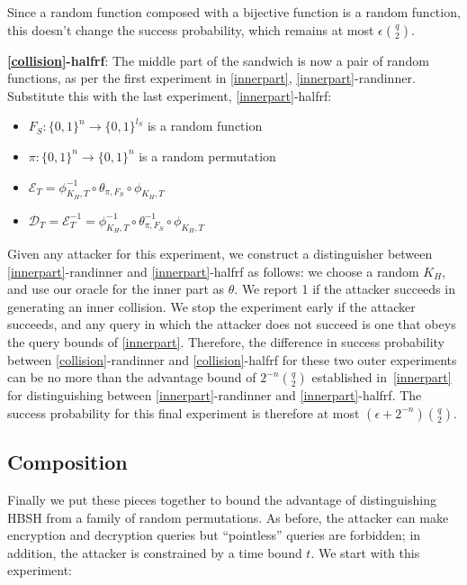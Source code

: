 \documentclass[journal=tosc,preprint,floatrow,submission]{iacrtrans}
\newcommand*{\xprm}[2]{\textsf{\ref*{#1}-#2}}
\newcommand*{\xprmtitle}[2]{\textbf{\xprm{#1}{#2}}}
\newcommand*{\calE}{\mathcal{E}}
\newcommand*{\calD}{\mathcal{D}}
\begin{document}
Since a random function composed with a bijective function is a random function,
this doesn't change the success probability, which remains at most
$\epsilon\binom{q}{2}$.

\xprmtitle{collision}{halfrf}: The middle part of the sandwich is now a pair of random functions,
as per the first experiment in \autoref{innerpart}, \xprm{innerpart}{randinner}.
Substitute this with the last experiment, \xprm{innerpart}{halfrf}:

\begin{itemize}
    \item $F_S: \{0,1\}^n \rightarrow \{0,1\}^{l_S}$ is a random function
    \item $\pi: \{0,1\}^n \rightarrow \{0,1\}^n$ is a random permutation
    \item $\calE_T = \phi^{-1}_{K_H, T} \circ \theta_{\pi, F_S} \circ \phi_{K_H, T}$
    \item $\calD_T = \calE_T^{-1} = \phi^{-1}_{K_H, T} \circ \theta_{\pi, F_S}^{-1} \circ \phi_{K_H, T}$
\end{itemize}

Given any attacker for this experiment,
we construct a distinguisher between \xprm{innerpart}{randinner} and \xprm{innerpart}{halfrf} as
follows: we choose a random $K_H$, and use our oracle for the inner part as $\theta$.
We report 1 if the attacker succeeds in generating an inner collision.
We stop the experiment early if the attacker succeeds, and any query in which the attacker
does not succeed is one that obeys the query bounds of \autoref{innerpart}.
Therefore, the difference in success probability
between \xprm{collision}{randinner} and \xprm{collision}{halfrf}
for these two outer experiments can be no more than
the advantage bound of $2^{-n}\binom{q}{2}$
established in~\autoref{innerpart} for distinguishing between
\xprm{innerpart}{randinner} and \xprm{innerpart}{halfrf}.
The success
probability for this final experiment is therefore at most
$(\epsilon + 2^{-n})\binom{q}{2}$.

\subsection{Composition}\label{composition}

Finally we put these pieces together to bound the advantage of distinguishing HBSH from
a family of random permutations. As before, the attacker can make encryption and decryption queries
but ``pointless'' queries are forbidden; in addition, the attacker is constrained by a time
bound $t$. We start with this experiment:
\end{document}
